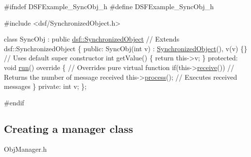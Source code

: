 \begin{DoxyCodeInclude}
\textcolor{preprocessor}{#ifndef DSFExample\_SyncObj\_h}
\textcolor{preprocessor}{#define DSFExample\_SyncObj\_h}

\textcolor{preprocessor}{#include <dsf/SynchronizedObject.h>}

\textcolor{keyword}{class }SyncObj : \textcolor{keyword}{public} \hyperlink{classdsf_1_1_synchronized_object}{dsf::SynchronizedObject} \textcolor{comment}{// Extends dsf::SynchronizedObject}
\{
\textcolor{keyword}{public}:
    SyncObj(\textcolor{keywordtype}{int} v) : \hyperlink{namespacedsf_acbf1798fc56cfb1707162a17e13f5fda}{SynchronizedObject}(), v(v) \{\} \textcolor{comment}{// Uses default super constructor}
    \textcolor{keywordtype}{int} getValue() \{
        \textcolor{keywordflow}{return} this->v;
    \}
\textcolor{keyword}{protected}:
    \textcolor{keywordtype}{void} \hyperlink{classdsf_1_1_synchronized_object_ae94875bd63d8071f8a563ac45ca7ccc2}{run}()\textcolor{keyword}{ override }\{ \textcolor{comment}{// Overrides pure virtual function}
        \textcolor{keywordflow}{if}(this->\hyperlink{classdsf_1_1_synchronized_object_a3ce496c6aaecc4b0ca3a4d09539a4920}{receive}()) \textcolor{comment}{// Returns the number of message received}
            this->\hyperlink{classdsf_1_1_task_box_ad35070ac305146aaa4073b2078d9209e}{process}(); \textcolor{comment}{// Executes received messages}
    \}
\textcolor{keyword}{private}:
    \textcolor{keywordtype}{int} v;
\};

\textcolor{preprocessor}{#endif}
\end{DoxyCodeInclude}
\hypertarget{index_manager}{}\subsection{Creating a manager class}\label{index_manager}
Obj\+Manager.\+h 
